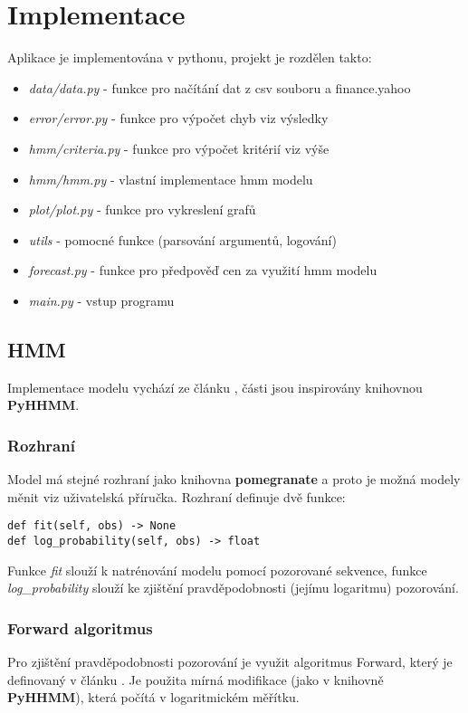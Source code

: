 \section{Implementace}

Aplikace je implementována v pythonu, projekt je rozdělen takto:
\begin{itemize}
    \item \emph{data/data.py} - funkce pro načítání dat z csv souboru a finance.yahoo
    \item \emph{error/error.py} - funkce pro výpočet chyb viz výsledky
    \item \emph{hmm/criteria.py} - funkce pro výpočet kritérií viz výše
    \item \emph{hmm/hmm.py} - vlastní implementace hmm modelu
    \item \emph{plot/plot.py} - funkce pro vykreslení grafů
    \item \emph{utils} - pomocné funkce (parsování argumentů, logování)
    \item \emph{forecast.py} - funkce pro předpověď cen za využití hmm modelu
    \item \emph{main.py} - vstup programu
\end{itemize}

\subsection{HMM}
Implementace modelu vychází ze článku \cite{Nguyen}, části jsou inspirovány knihovnou \textbf{PyHHMM}.

\subsubsection{Rozhraní}
Model má stejné rozhraní jako knihovna \textbf{pomegranate} a proto je možná modely měnit viz uživatelská příručka. Rozhraní definuje dvě funkce:
\begin{lstlisting}
def fit(self, obs) -> None
def log_probability(self, obs) -> float
\end{lstlisting}
Funkce \emph{fit} slouží k natrénování modelu pomocí pozorované sekvence, funkce \emph{log\_probability} slouží ke zjištění pravděpodobnosti (jejímu logaritmu) pozorování.

\subsubsection{Forward algoritmus}
Pro zjištění pravděpodobnosti pozorování je využit algoritmus Forward, který je definovaný v článku \cite{Nguyen}. Je použita mírná modifikace (jako v knihovně \textbf{PyHHMM}), která počítá v logaritmickém měřítku.

